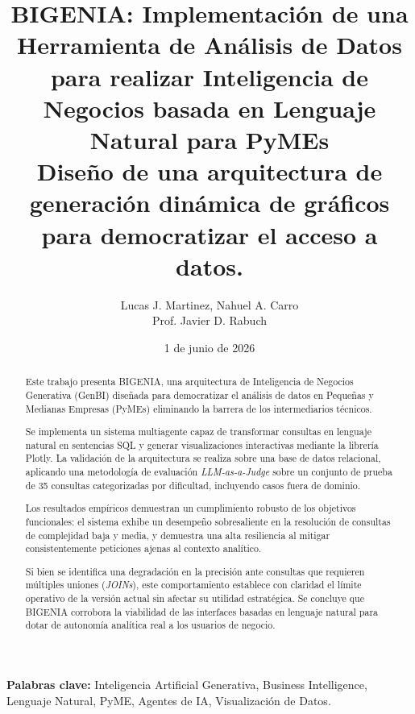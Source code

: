 \documentclass[10pt, a4paper, twocolumn]{article}
\title{
  \textbf{BIGENIA: Implementación de una Herramienta de Análisis de Datos para realizar Inteligencia de Negocios basada en Lenguaje Natural para PyMEs} \\[0.5em]
  \large Diseño de una arquitectura de generación dinámica de gráficos para democratizar el acceso a datos.
}
\author{
  Lucas J. Martinez, Nahuel A. Carro \\
  \small Prof. Javier D. Rabuch
}
\date{1 de junio de 2026}
\begin{document}
\maketitle

\begin{abstract}
  Este trabajo presenta BIGENIA, una arquitectura de Inteligencia de Negocios
  Generativa (GenBI) diseñada para democratizar el análisis de datos en
  Pequeñas y Medianas Empresas (PyMEs) eliminando la barrera de los
  intermediarios técnicos.

  Se implementa un sistema multiagente capaz de transformar consultas en
  lenguaje natural en sentencias SQL y generar visualizaciones interactivas
  mediante la librería Plotly. La validación de la arquitectura se realiza
  sobre una base de datos relacional, aplicando una metodología de
  evaluación \textit{LLM-as-a-Judge} sobre un conjunto de prueba de 35
  consultas categorizadas por dificultad, incluyendo casos fuera de dominio.

  Los resultados empíricos demuestran un cumplimiento robusto de los objetivos
  funcionales: el sistema exhibe un desempeño sobresaliente en la resolución
  de consultas de complejidad baja y media, y demuestra una alta resiliencia
  al mitigar consistentemente peticiones ajenas al contexto analítico.

  Si bien se identifica una degradación en la precisión ante consultas que
  requieren múltiples uniones (\textit{JOINs}), este comportamiento establece
  con claridad el límite operativo de la versión actual sin afectar su utilidad
  estratégica. Se concluye que BIGENIA corrobora la viabilidad de las
  interfaces basadas en lenguaje natural para dotar de autonomía analítica
  real a los usuarios de negocio.
\end{abstract}

\vspace{0.5em}
\noindent\textbf{Palabras clave:} Inteligencia Artificial Generativa, Business
Intelligence, Lenguaje Natural, PyME, Agentes de IA, Visualización de Datos.
\vspace{2em}










\end{document}
